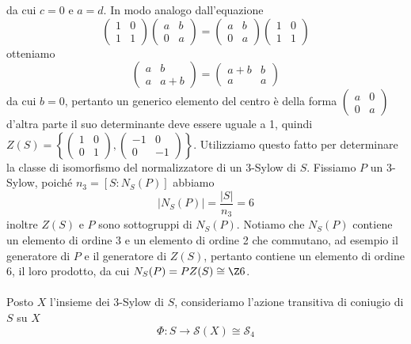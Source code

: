 \documentclass[11pt]{scrartcl}
\begin{document}
	da cui $c = 0$ e $a = d$. In modo analogo dall'equazione
	\[
	\begin{pmatrix}
		1 & 0\\
		1 & 1
	\end{pmatrix}
	\begin{pmatrix}
		a & b\\
		0 & a
	\end{pmatrix} = 
	\begin{pmatrix}
		a & b\\
		0 & a
	\end{pmatrix}
	\begin{pmatrix}
		1 & 0\\
		1 & 1
	\end{pmatrix}
	\]
	otteniamo 
	\[
	\begin{pmatrix}
		a & b\\
		a & a + b
	\end{pmatrix} = 
	\begin{pmatrix}
		a + b & b\\
		a & a
	\end{pmatrix}
	\]
	da cui $b = 0$, pertanto un generico elemento del centro è della forma
	$
	\begin{pmatrix}
		a & 0\\
		0 & a
	\end{pmatrix}
	$
	d'altra parte il suo determinante deve essere uguale a 1, quindi $Z(S) = 
	\left\{\begin{pmatrix}
		1 & 0\\
		0 & 1
	\end{pmatrix}, \begin{pmatrix}
		-1 & 0\\
		0 & -1
	\end{pmatrix}\right\}$. Utilizziamo questo fatto per determinare la classe
	di isomorfismo del normalizzatore di un 3-Sylow di $S$. \newline 
	Fissiamo $P$ un 3-Sylow, poiché $n_3 = [S: N_S(P)]$ abbiamo 
	\[
	|N_S(P)| = \frac{|S|}{n_3} = 6
	\]
	inoltre $Z(S)$ e $P$ sono sottogruppi di $N_S(P)$. Notiamo che $N_S(P)$
	contiene un elemento di ordine 3 e un elemento di ordine 2 che commutano, 
	ad esempio il generatore di $P$ e il generatore di $Z(S)$,
	pertanto contiene un elemento di ordine 6, il loro prodotto, da cui 
	$N_S(P) = PZ(S) \cong \Z6$.
	\\\\
	Posto $X$ l'insieme dei 3-Sylow di $S$, consideriamo
	l'azione transitiva di coniugio di $S$ su $X$
	\[
	\Phi: S \longrightarrow \mathcal{S}(X) \cong \mathcal{S}_4
	\]
\end{document}
